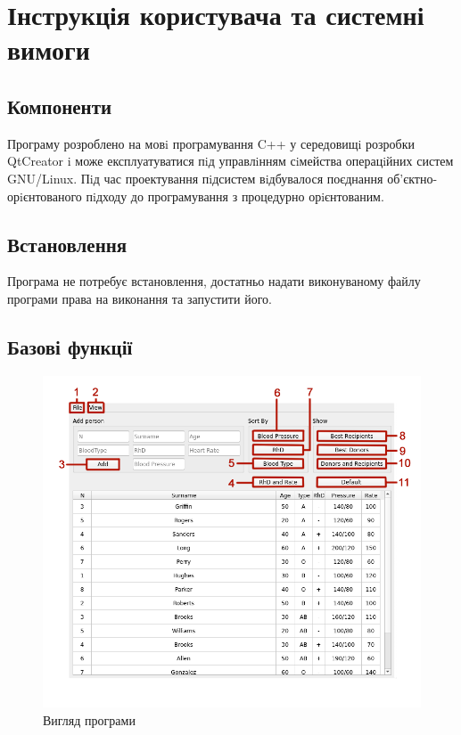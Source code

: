\documentclass[oneside,14pt]{extarticle}
\begin{document}
\section{Інструкція користувача та системні вимоги}
\subsection{Компоненти}
Програму розроблено на мовi програмування C++ у середовищi розробки QtCreator i може експлуатуватися пiд управлiнням сiмейства операцiйних систем GNU/Linux. Пiд час проектування пiдсистем вiдбувалося поєднання об’єктно-орiєнтованого пiдходу до програмування з процедурно орiєнтованим.

\subsection{Встановлення}
Програма не потребує встановлення, достатньо надати виконуваному файлу програми права на виконання та запустити його.
\subsection{Базові функції}
\begin{figure}[H]
	\centering
	\includegraphics[scale=0.6]{13}
	\caption{Вигляд програми}
\end{figure}
\end{document}
